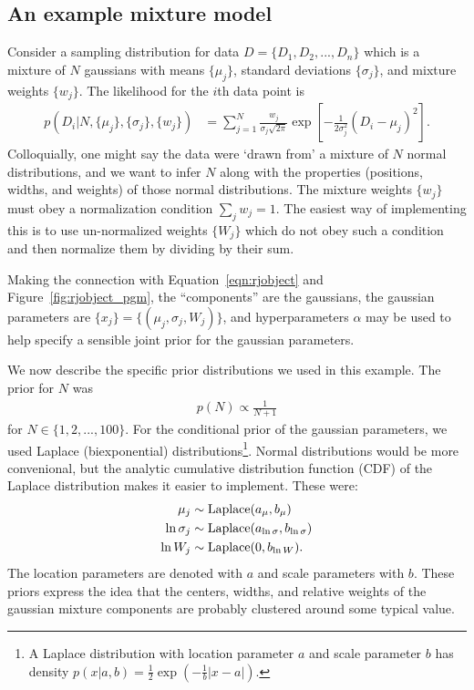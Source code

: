 \documentclass[article, nojss]{jss}
\begin{document}
\subsection{An example mixture model}
Consider a sampling distribution
for data $D=\{D_1, D_2, ..., D_n\}$ which is a mixture of $N$ gaussians
with means $\{\mu_j\}$, standard deviations $\{\sigma_j\}$, and
mixture weights $\{w_j\}$. The likelihood for the $i$th data point is
\begin{align}
p\left(D_i | N, \{\mu_j\}, \{\sigma_j\}, \{w_j\}\right) &=
\sum_{j=1}^N \frac{w_j}{\sigma_j\sqrt{2\pi}}
\exp\left[-\frac{1}{2\sigma_j^2}\left(D_i - \mu_j\right)^2\right].
\end{align}
Colloquially, one might say the data were `drawn from' a mixture of
$N$ normal distributions, and we want to infer $N$ along with the
properties (positions, widths, and weights) of those normal distributions.
The mixture weights $\{w_j\}$ must obey a normalization condition
$\sum_j w_j = 1$. The easiest way of implementing this is to use
un-normalized weights $\{W_j\}$ which do not obey
such a condition and then normalize them by dividing by their sum.

Making the connection with Equation~\ref{eqn:rjobject} and
Figure~\ref{fig:rjobject_pgm}, the ``components'' are the gaussians,
the gaussian parameters are $\{x_j\} = \{(\mu_j, \sigma_j, W_j)\}$,
and hyperparameters $\alpha$ may be used to help specify
a sensible joint prior for the gaussian parameters.

We now describe the specific prior distributions we used in this example.
The prior for $N$ was
\begin{align}
p(N) \propto \frac{1}{N+1}
\end{align}
for $N \in \{1, 2, ..., 100\}$.
For the conditional prior of the gaussian parameters,
we used Laplace (biexponential)
distributions\footnote{A Laplace
distribution with location parameter $a$ and scale parameter
$b$ has density $p(x | a, b) = \frac{1}{2}\exp\left(-\frac{1}{b}|x - a|\right)$.}.
Normal distributions would be more convenional, but the analytic cumulative
distribution function (CDF) of the Laplace distribution makes it easier to
implement. These were:
\begin{align}
\mu_j &\sim \textnormal{Laplace}(a_\mu, b_\mu)\label{eqn:cond_prior1}\\
\ln\sigma_j &\sim \textnormal{Laplace}(a_{\ln\sigma}, b_{\ln\sigma})\label{eqn:cond_prior2}\\
\ln W_j &\sim \textnormal{Laplace}(0, b_{\ln W}).\label{eqn:cond_prior3}
\end{align}
The location parameters are denoted with $a$ and scale parameters with $b$.
These priors express the idea that the centers, widths, and relative weights
of the gaussian mixture components are probably clustered around some typical
value.
\end{document}
